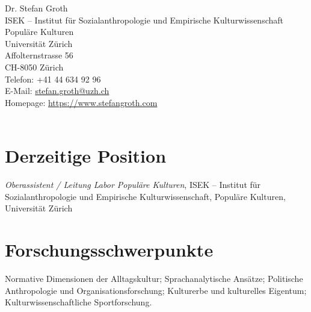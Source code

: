 \documentclass[11pt, a4paper]{article} %
\newcommand{\years}[1]{\marginnote{\scriptsize #1}} %
\begin{document}
{\LARGE Dr. Stefan Groth}\\[1cm] %
ISEK – Institut für Sozialanthropologie und Empirische Kulturwissenschaft\\
Populäre Kulturen\\ 
Universität Zürich\\
Affolternstrasse 56\\  
CH-8050 Zürich\\[.2cm]  
Telefon: +41 44 634 92 96\\ %
E-Mail: \href{mailto:stefan.groth@uzh.ch}{stefan.groth@uzh.ch}\\
Homepage: \href{https://www.stefangroth.com}{https://www.stefangroth.com}\\\\
\section*{Derzeitige Position}
\years{seit 09/2016}\emph{Oberassistent / Leitung Labor Populäre Kulturen}, ISEK – Institut für Sozialanthropologie und Empirische Kulturwissenschaft, Populäre Kulturen, Universität Zürich %
\section*{Forschungsschwerpunkte}
    Normative Dimensionen der Alltagskultur; 
    Sprachanalytische Ansätze; 
    Politische Anthropologie und Organisationsforschung; 
    Kulturerbe und kulturelles Eigentum; 
    Kulturwissenschaftliche Sportforschung.
\end{document}
